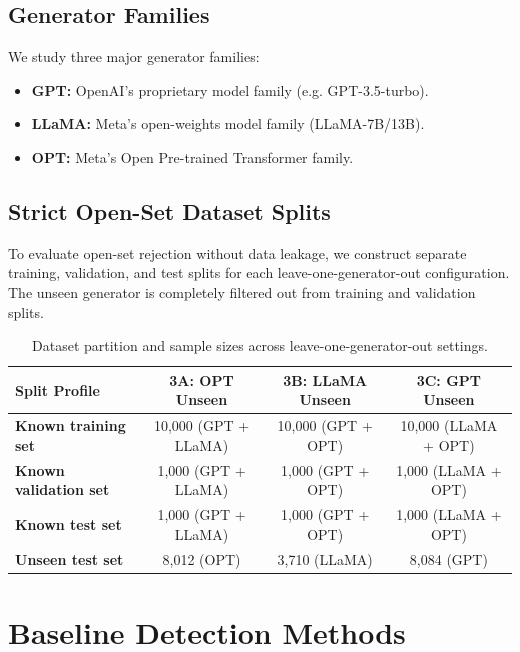 \documentclass[12pt,a4paper]{report}
\begin{document}
\section{Generator Families}
We study three major generator families:
\begin{itemize}
    \item \textbf{GPT:} OpenAI's proprietary model family (e.g. GPT-3.5-turbo).
    \item \textbf{LLaMA:} Meta's open-weights model family (LLaMA-7B/13B).
    \item \textbf{OPT:} Meta's Open Pre-trained Transformer family.
\end{itemize}

\section{Strict Open-Set Dataset Splits}
To evaluate open-set rejection without data leakage, we construct separate training, validation, and test splits for each leave-one-generator-out configuration. The unseen generator is completely filtered out from training and validation splits.

\begin{table}[h]
\centering
\begin{tabular}{lccc}
\toprule
\textbf{Split Profile} & \textbf{3A: OPT Unseen} & \textbf{3B: LLaMA Unseen} & \textbf{3C: GPT Unseen} \\
\midrule
\textbf{Known training set} & 10,000 (GPT + LLaMA) & 10,000 (GPT + OPT) & 10,000 (LLaMA + OPT) \\
\textbf{Known validation set} & 1,000 (GPT + LLaMA) & 1,000 (GPT + OPT) & 1,000 (LLaMA + OPT) \\
\textbf{Known test set} & 1,000 (GPT + LLaMA) & 1,000 (GPT + OPT) & 1,000 (LLaMA + OPT) \\
\textbf{Unseen test set} & 8,012 (OPT) & 3,710 (LLaMA) & 8,084 (GPT) \\
\bottomrule
\end{tabular}
\caption{Dataset partition and sample sizes across leave-one-generator-out settings.}
\label{tab:dataset_splits}
\end{table}

\chapter{Baseline Detection Methods}
\label{ch:baselines}
\end{document}
